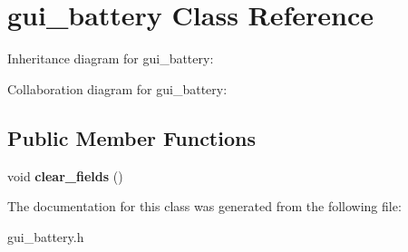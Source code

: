\hypertarget{classgui__battery}{}\section{gui\+\_\+battery Class Reference}
\label{classgui__battery}


Inheritance diagram for gui\+\_\+battery\+:


Collaboration diagram for gui\+\_\+battery\+:
\subsection*{Public Member Functions}
\begin{DoxyCompactItemize}
\item 
void {\bfseries clear\+\_\+fields} ()\hypertarget{classgui__battery_ac149006835c75a13937f648371c344cd}{}\label{classgui__battery_ac149006835c75a13937f648371c344cd}

\end{DoxyCompactItemize}


The documentation for this class was generated from the following file\+:\begin{DoxyCompactItemize}
\item 
gui\+\_\+battery.\+h\end{DoxyCompactItemize}
